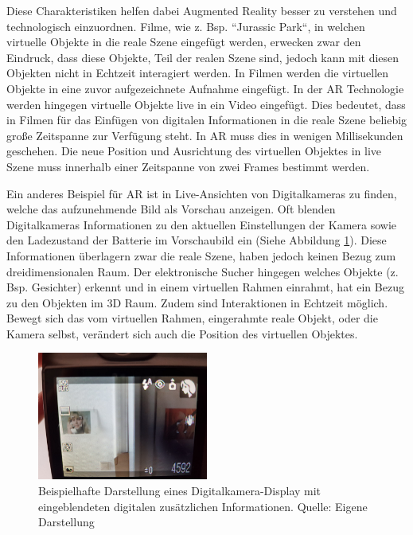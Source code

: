 Diese Charakteristiken helfen dabei Augmented Reality besser zu verstehen und technologisch einzuordnen. \cite{Azuma.1997} Filme, wie z. Bsp. ``Jurassic Park``, in welchen virtuelle Objekte in die reale Szene eingefügt werden, erwecken zwar den Eindruck, dass diese Objekte, Teil der realen Szene sind, jedoch kann mit diesen Objekten nicht in Echtzeit interagiert werden. \cite{Tonnis2010} In Filmen werden die virtuellen Objekte in eine zuvor aufgezeichnete Aufnahme eingefügt. 
In der AR Technologie werden hingegen virtuelle Objekte live in ein Video eingefügt. Dies bedeutet, dass in  Filmen für das Einfügen von digitalen Informationen in die reale Szene beliebig große Zeitspanne zur Verfügung steht. 
In AR muss dies in wenigen Millisekunden geschehen. Die neue Position und Ausrichtung des virtuellen Objektes in live Szene muss innerhalb einer Zeitspanne von zwei Frames bestimmt werden.

Ein anderes Beispiel für AR ist in Live-Ansichten von Digitalkameras zu finden, welche das aufzunehmende Bild als Vorschau anzeigen. Oft blenden Digitalkameras Informationen zu den aktuellen Einstellungen der Kamera sowie den 
Ladezustand der Batterie im Vorschaubild ein (Siehe Abbildung \ref{img:ar_camera_example}). Diese Informationen überlagern zwar die reale Szene, haben jedoch keinen Bezug zum dreidimensionalen Raum. 
Der elektronische Sucher hingegen welches Objekte (z. Bsp. Gesichter) erkennt und in einem virtuellen Rahmen einrahmt, hat ein Bezug zu den Objekten im 3D Raum. 
Zudem sind Interaktionen in Echtzeit möglich. Bewegt sich das vom virtuellen Rahmen, eingerahmte reale Objekt, oder die Kamera selbst, verändert sich auch die Position des virtuellen Objektes. 

\begin{figure}
	\centering
	\includegraphics[width=0.50\textwidth]{resources/fundamentals/example_camera_screen_ar}
	\caption{Beispielhafte Darstellung eines Digitalkamera-Display mit eingeblendeten digitalen zusätzlichen Informationen. Quelle: Eigene Darstellung}
	\label{img:ar_camera_example}
\end{figure}

